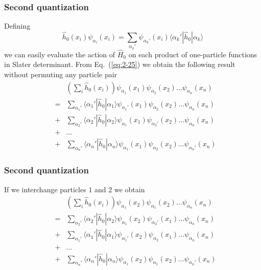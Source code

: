 \documentclass{beamer}
\begin{document}
\begin{frame}
\frametitle{Second quantization}

\begin{block}{}
Defining
\begin{equation}
	\hat{h}_0(x_i) \psi_{\alpha_i}(x_i) = \sum_{\alpha_k'} \psi_{\alpha_k'}(x_i) \langle\alpha_k'|\hat{h}_0|\alpha_k\rangle \label{eq:2-25}
\end{equation}
we can easily  evaluate the action of $\hat{H}_0$ on each product of one-particle functions in Slater determinant.
From Eq.~(\ref{eq:2-25})  we obtain the following result without  permuting any particle pair 
\begin{eqnarray}
	&& \left( \sum_i \hat{h}_0(x_i) \right) \psi_{\alpha_1}(x_1)\psi_{\alpha_2}(x_2) \dots \psi_{\alpha_n}(x_n) \nonumber \\
	& =&\sum_{\alpha_1'} \langle \alpha_1'|\hat{h}_0|\alpha_1\rangle 
		\psi_{\alpha_1'}(x_1)\psi_{\alpha_2}(x_2) \dots \psi_{\alpha_n}(x_n) \nonumber \\
	&+&\sum_{\alpha_2'} \langle \alpha_2'|\hat{h}_0|\alpha_2\rangle
		\psi_{\alpha_1}(x_1)\psi_{\alpha_2'}(x_2) \dots \psi_{\alpha_n}(x_n) \nonumber \\
	&+& \dots \nonumber \\
	&+&\sum_{\alpha_n'} \langle \alpha_n'|\hat{h}_0|\alpha_n\rangle
		\psi_{\alpha_1}(x_1)\psi_{\alpha_2}(x_2) \dots \psi_{\alpha_n'}(x_n) \label{eq:2-26}
\end{eqnarray}
\end{block}
\end{frame}

\begin{frame}
\frametitle{Second quantization}

\begin{block}{}
If we interchange particles $1$ and $2$  we obtain
\begin{eqnarray}
	&& \left( \sum_i \hat{h}_0(x_i) \right) \psi_{\alpha_1}(x_2)\psi_{\alpha_1}(x_2) \dots \psi_{\alpha_n}(x_n) \nonumber \\
	& =&\sum_{\alpha_2'} \langle \alpha_2'|\hat{h}_0|\alpha_2\rangle 
		\psi_{\alpha_1}(x_2)\psi_{\alpha_2'}(x_1) \dots \psi_{\alpha_n}(x_n) \nonumber \\
	&+&\sum_{\alpha_1'} \langle \alpha_1'|\hat{h}_0|\alpha_1\rangle
		\psi_{\alpha_1'}(x_2)\psi_{\alpha_2}(x_1) \dots \psi_{\alpha_n}(x_n) \nonumber \\
	&+& \dots \nonumber \\
	&+&\sum_{\alpha_n'} \langle \alpha_n'|\hat{h}_0|\alpha_n\rangle
		\psi_{\alpha_1}(x_2)\psi_{\alpha_1}(x_2) \dots \psi_{\alpha_n'}(x_n) \label{eq:2-27}
\end{eqnarray}
\end{block}
\end{frame}
\end{document}
